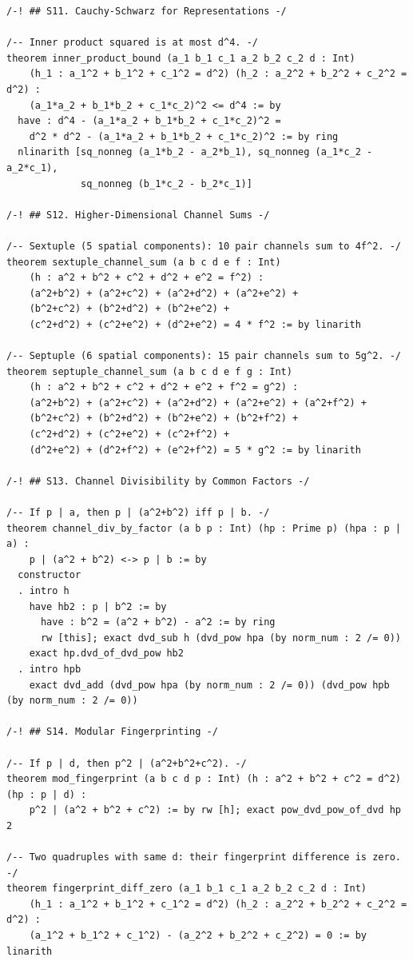 \documentclass[11pt,openright,twoside]{book}
\theoremstyle{definition}
\begin{document}
\begin{lstlisting}[style=lean]
/-! ## S11. Cauchy-Schwarz for Representations -/

/-- Inner product squared is at most d^4. -/
theorem inner_product_bound (a_1 b_1 c_1 a_2 b_2 c_2 d : Int)
    (h_1 : a_1^2 + b_1^2 + c_1^2 = d^2) (h_2 : a_2^2 + b_2^2 + c_2^2 = d^2) :
    (a_1*a_2 + b_1*b_2 + c_1*c_2)^2 <= d^4 := by
  have : d^4 - (a_1*a_2 + b_1*b_2 + c_1*c_2)^2 =
    d^2 * d^2 - (a_1*a_2 + b_1*b_2 + c_1*c_2)^2 := by ring
  nlinarith [sq_nonneg (a_1*b_2 - a_2*b_1), sq_nonneg (a_1*c_2 - a_2*c_1),
             sq_nonneg (b_1*c_2 - b_2*c_1)]

/-! ## S12. Higher-Dimensional Channel Sums -/

/-- Sextuple (5 spatial components): 10 pair channels sum to 4f^2. -/
theorem sextuple_channel_sum (a b c d e f : Int)
    (h : a^2 + b^2 + c^2 + d^2 + e^2 = f^2) :
    (a^2+b^2) + (a^2+c^2) + (a^2+d^2) + (a^2+e^2) +
    (b^2+c^2) + (b^2+d^2) + (b^2+e^2) +
    (c^2+d^2) + (c^2+e^2) + (d^2+e^2) = 4 * f^2 := by linarith

/-- Septuple (6 spatial components): 15 pair channels sum to 5g^2. -/
theorem septuple_channel_sum (a b c d e f g : Int)
    (h : a^2 + b^2 + c^2 + d^2 + e^2 + f^2 = g^2) :
    (a^2+b^2) + (a^2+c^2) + (a^2+d^2) + (a^2+e^2) + (a^2+f^2) +
    (b^2+c^2) + (b^2+d^2) + (b^2+e^2) + (b^2+f^2) +
    (c^2+d^2) + (c^2+e^2) + (c^2+f^2) +
    (d^2+e^2) + (d^2+f^2) + (e^2+f^2) = 5 * g^2 := by linarith

/-! ## S13. Channel Divisibility by Common Factors -/

/-- If p | a, then p | (a^2+b^2) iff p | b. -/
theorem channel_div_by_factor (a b p : Int) (hp : Prime p) (hpa : p | a) :
    p | (a^2 + b^2) <-> p | b := by
  constructor
  . intro h
    have hb2 : p | b^2 := by
      have : b^2 = (a^2 + b^2) - a^2 := by ring
      rw [this]; exact dvd_sub h (dvd_pow hpa (by norm_num : 2 /= 0))
    exact hp.dvd_of_dvd_pow hb2
  . intro hpb
    exact dvd_add (dvd_pow hpa (by norm_num : 2 /= 0)) (dvd_pow hpb (by norm_num : 2 /= 0))

/-! ## S14. Modular Fingerprinting -/

/-- If p | d, then p^2 | (a^2+b^2+c^2). -/
theorem mod_fingerprint (a b c d p : Int) (h : a^2 + b^2 + c^2 = d^2) (hp : p | d) :
    p^2 | (a^2 + b^2 + c^2) := by rw [h]; exact pow_dvd_pow_of_dvd hp 2

/-- Two quadruples with same d: their fingerprint difference is zero. -/
theorem fingerprint_diff_zero (a_1 b_1 c_1 a_2 b_2 c_2 d : Int)
    (h_1 : a_1^2 + b_1^2 + c_1^2 = d^2) (h_2 : a_2^2 + b_2^2 + c_2^2 = d^2) :
    (a_1^2 + b_1^2 + c_1^2) - (a_2^2 + b_2^2 + c_2^2) = 0 := by linarith


\end{lstlisting}
\end{document}
